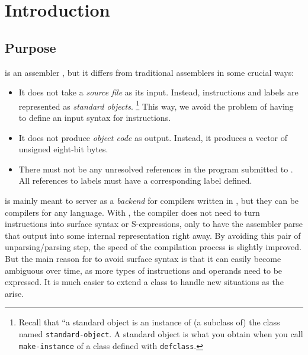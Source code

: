 \chapter{Introduction}
%

\section{Purpose}

\sysname{} is an assembler \cite{Salomon:1992:AL:152201}, but it
differs from traditional assemblers in some crucial ways:

\begin{itemize}
\item It does not take a \emph{source file} as its input.  Instead,
  instructions and labels are represented as \emph{standard
    objects}.%
\footnote{Recall that ``a standard object is an instance of (a
  subclass of) the class named \texttt{standard-object}.  A standard
  object is what you obtain when you call \texttt{make-instance} of
  a class defined with \texttt{defclass}.}  This way, we avoid the
problem of having to define an input syntax for instructions.
\item It does not produce \emph{object code} as output.  Instead, it
  produces a \commonlisp{} vector of unsigned eight-bit bytes.
\item There must not be any unresolved references in the program
  submitted to \sysname{}.  All references to labels must have a
  corresponding label defined.
\end{itemize}

\sysname{} is mainly meant to server as a \emph{backend} for compilers
written in \commonlisp{}, but they can be compilers for any language.
With \sysname{}, the compiler does not need to turn instructions into
surface syntax or S-expressions, only to have the assembler parse that
output into some internal representation right away.  By avoiding this
pair of unparsing/parsing step, the speed of the compilation process
is slightly improved.  But the main reason for \sysname{} to avoid
surface syntax is that it can easily become ambiguous over time, as
more types of instructions and operands need to be expressed.  It is
much easier to extend a \clos{} class to handle new situations as the
arise.
